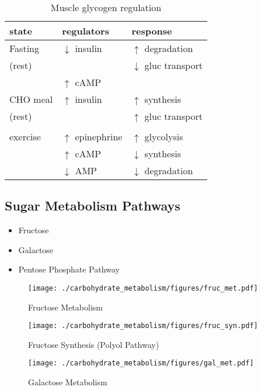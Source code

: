 \documentclass{scrartcl}
\begin{document}
\begin{table}[htbp]
\caption{\label{tab:orgcd3de7e}
Muscle glycogen regulation}
\centering
\begin{tabular}{lll}
state & regulators & response\\
\hline
Fasting & \(\downarrow\) insulin & \(\uparrow\) degradation\\
(rest) &  & \(\downarrow\) gluc transport\\
 & \(\uparrow\) cAMP & \\
CHO meal & \(\uparrow\) insulin & \(\uparrow\) synthesis\\
(rest) &  & \(\uparrow\) gluc transport\\
 &  & \\
exercise & \(\uparrow\) epinephrine & \(\uparrow\) glycolysis\\
 & \(\uparrow\) cAMP & \(\downarrow\) synthesis\\
 & \(\downarrow\) AMP & \(\downarrow\) degradation\\
\end{tabular}
\end{table}

\subsection{Sugar Metabolism Pathways}
\label{sec:org28842c7}
\begin{itemize}
\item Fructose
\item Galactose
\item Pentose Phosphate Pathway
\end{itemize}

\begin{figure}[htbp]
\centering
\texttt{[image: ./carbohydrate\_metabolism/figures/fruc\_met.pdf]}
\caption{\label{fig:org57eb5ee}
Fructose Metabolism}
\end{figure}

\begin{figure}[htbp]
\centering
\texttt{[image: ./carbohydrate\_metabolism/figures/fruc\_syn.pdf]}
\caption{\label{fig:org58be872}
Fructose Synthesis (Polyol Pathway)}
\end{figure}

\begin{figure}[htbp]
\centering
\texttt{[image: ./carbohydrate\_metabolism/figures/gal\_met.pdf]}
\caption{\label{fig:org8cc0f8b}
Galactose Metabolism}
\end{figure}
\end{document}
